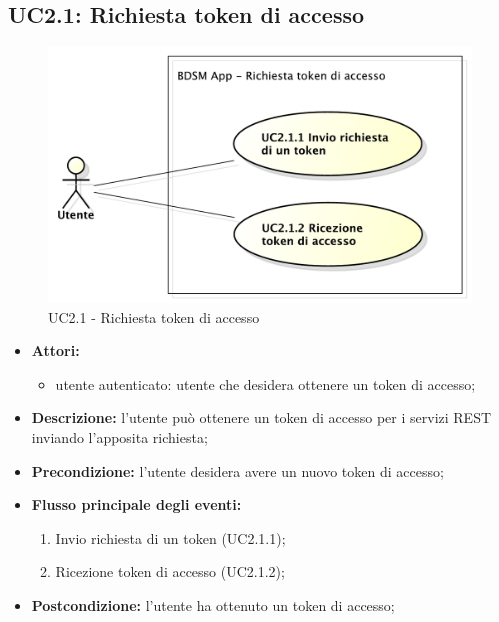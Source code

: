 \subsection{UC2.1: Richiesta token di accesso}
\begin{figure}[htbp]
	\centering
	\centerline{\includegraphics[scale=0.50]{./images/UC2_1.pdf}}
	\caption{UC2.1 - Richiesta token di accesso}
\end{figure}

\begin{itemize}
	\item \textbf{Attori:}
	\begin{itemize}
		\item utente autenticato: utente che desidera ottenere un token di accesso;
	\end{itemize}
	\item \textbf{Descrizione:} l'utente può ottenere un token di accesso per i servizi REST inviando l'apposita richiesta;
	\item \textbf{Precondizione:} l'utente desidera avere un nuovo token di accesso;
	\item \textbf{Flusso principale degli eventi:}
	\begin{enumerate}
		\item Invio richiesta di un token (UC2.1.1);
		\item Ricezione token di accesso (UC2.1.2);
	\end{enumerate}
	\item \textbf{Postcondizione:} l'utente ha ottenuto un token di accesso;
\end{itemize}

